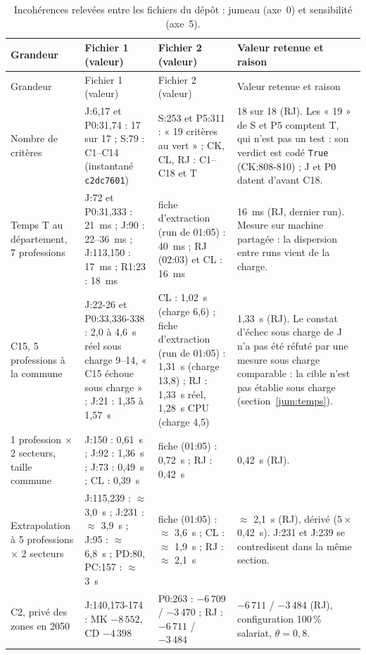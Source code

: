 {\small
\begin{longtable}{@{}p{2.9cm}p{3.5cm}p{3.5cm}p{4.7cm}@{}}
\caption{Incohérences relevées entre les fichiers du dépôt : jumeau (axe~0) et sensibilité (axe~5).}
\label{jum:tab:incoherences}\\
\toprule
Grandeur & Fichier 1 (valeur) & Fichier 2 (valeur) & Valeur retenue et raison \\
\midrule
\endfirsthead
\toprule
Grandeur & Fichier 1 (valeur) & Fichier 2 (valeur) & Valeur retenue et raison \\
\midrule
\endhead
\bottomrule
\endfoot
Nombre de critères & J:6,17 et P0:31,74 : 17 sur 17 ; S:79 : C1--C14 (instantané \texttt{c2dc7601}) & S:253 et
  P5:311 : « 19 critères au vert » ; CK, CL, RJ : C1--C18 et T & 18 sur 18 (RJ). Les « 19 » de S et P5
  comptent T, qui n'est pas un test : son verdict est codé \texttt{True} (CK:808-810) ; J et P0 datent d'avant
  C18. \\
Temps T au département, 7 professions & J:72 et P0:31,333 : 21~ms ; J:90 : 22--36~ms ; J:113,150 : 17~ms ; R1:23 :
  18~ms & fiche d'extraction (run de 01:05) : 40~ms ; RJ (02:03) et CL : 16~ms & 16~ms (RJ, dernier run). Mesure
  sur machine partagée : la dispersion entre runs vient de la charge. \\
C15, 5 professions à la commune & J:22-26 et P0:33,336-338 : 2,0 à 4,6~s réel sous charge 9--14, « C15 échoue
  sous charge » ; J:21 : 1,35 à 1,57~s & CL : 1,02~s (charge 6,6) ; fiche d'extraction (run de 01:05) : 1,31~s
  (charge 13,8) ; RJ : 1,33~s réel, 1,28~s CPU (charge 4,5) & 1,33~s (RJ). Le constat d'échec sous charge de J
  n'a pas été réfuté par une mesure sous charge comparable : la cible n'est pas établie sous charge
  (section~\ref{jum:temps}). \\
1 profession $\times$ 2 secteurs, taille commune & J:150 : 0,61~s ; J:92 : 1,36~s ; J:73 : 0,49~s ; CL : 0,39~s &
  fiche (01:05) : 0,72~s ; RJ : 0,42~s & 0,42~s (RJ). \\
Extrapolation à 5 professions $\times$ 2 secteurs & J:115,239 : $\approx$ 3,0~s ; J:231 : $\approx$ 3,9~s ;
  J:95 : $\approx$ 6,8~s ; PD:80, PC:157 : $\approx$ 3~s & fiche (01:05) : $\approx$ 3,6~s ; CL : $\approx$ 1,9~s ;
  RJ : $\approx$ 2,1~s & $\approx$ 2,1~s (RJ), dérivé ($5 \times$ 0,42~s). J:231 et J:239 se contredisent dans la
  même section. \\
C2, privé des zones en 2050 & J:140,173-174 : MK $-8\,552$, CD $-4\,398$ & P0:263 : $-6\,709$ / $-3\,470$ ; RJ :
  $-6\,711$ / $-3\,484$ & $-6\,711$ / $-3\,484$ (RJ), configuration 100\,\% salariat, $\theta = 0{,}8$. \\

\end{longtable}}
